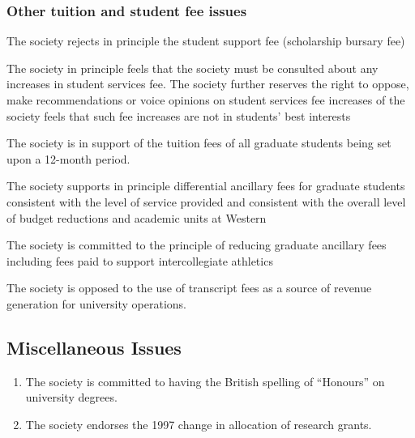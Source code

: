\subsubsection{Other tuition and student fee issues}
\begin{longenum}[ label*=\thesubsubsection.\arabic*., align=left]
\item	The society rejects in principle the student support fee (scholarship bursary fee) 
\item The society in principle feels that the society must be consulted about any increases in student services fee.  The society further reserves the right to oppose, make recommendations or voice opinions on student services fee increases of the society feels that such fee increases are not in students' best interests
\item The society is in support of the tuition fees of all graduate students being set upon a 12-month period.
\item The society supports in principle differential ancillary fees for graduate students consistent with the level of service provided and consistent with the overall level of budget reductions and academic units at Western 
\item The society is committed to the principle of reducing graduate ancillary fees including fees paid to support intercollegiate athletics
\item The society is opposed to the use of transcript fees as a source of revenue generation for university operations.
\end{longenum}

\subsection{Miscellaneous Issues}
\begin{enumerate}
\item The society is committed to having the British spelling of ``Honours'' on university degrees. 
\item The society endorses the 1997 change in allocation of research grants.
 
\end{enumerate}


